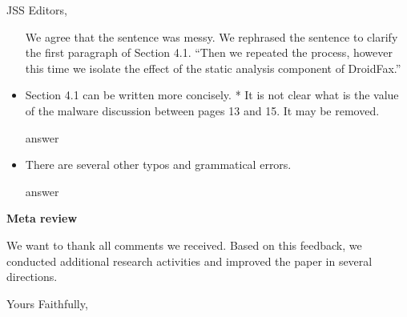 \documentclass{letter}
\begin{document}
\begin{letter}{JSS Editors,}
\begin{itemize}
{\color{blue}{\bf Answer:} We agree that the sentence was messy. We rephrased the sentence to clarify the first paragraph of Section 4.1. ``Then we repeated the process, however this time we isolate the effect of the static analysis component of DroidFax.''}

\vspace{0.2cm}

\item Section 4.1 can be written more concisely.
* It is not clear what is the value of the malware discussion between pages 13 and 15. It may be removed.


\vspace{0.2cm}

{\color{blue}{\bf Answer:} answer}

\vspace{0.2cm}

\item There are several other typos and grammatical errors.


\vspace{0.2cm}

{\color{blue}{\bf Answer:} answer}





\end{itemize}



{\bf Meta review}

We want to thank all comments we received. Based on this feedback, we conducted additional research activities and improved the paper in several directions.

\closing{Yours Faithfully,}


\end{letter}
\end{document}
